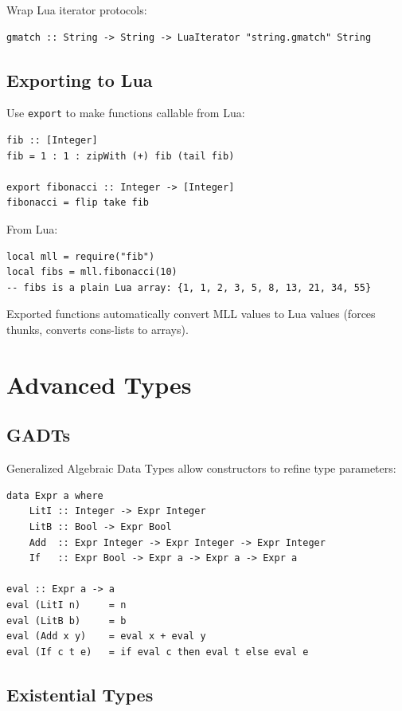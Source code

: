 \documentclass[11pt,a4paper]{article}
\begin{document}
Wrap Lua iterator protocols:

\begin{lstlisting}
gmatch :: String -> String -> LuaIterator "string.gmatch" String
\end{lstlisting}

\subsection{Exporting to Lua}

Use \texttt{export} to make functions callable from Lua:

\begin{lstlisting}
fib :: [Integer]
fib = 1 : 1 : zipWith (+) fib (tail fib)

export fibonacci :: Integer -> [Integer]
fibonacci = flip take fib
\end{lstlisting}

From Lua:
\begin{lstlisting}[language={}]
local mll = require("fib")
local fibs = mll.fibonacci(10)
-- fibs is a plain Lua array: {1, 1, 2, 3, 5, 8, 13, 21, 34, 55}
\end{lstlisting}

Exported functions automatically convert MLL values to Lua values
(forces thunks, converts cons-lists to arrays).

\section{Advanced Types}

\subsection{GADTs}

Generalized Algebraic Data Types allow constructors to refine type
parameters:

\begin{lstlisting}
data Expr a where
    LitI :: Integer -> Expr Integer
    LitB :: Bool -> Expr Bool
    Add  :: Expr Integer -> Expr Integer -> Expr Integer
    If   :: Expr Bool -> Expr a -> Expr a -> Expr a

eval :: Expr a -> a
eval (LitI n)     = n
eval (LitB b)     = b
eval (Add x y)    = eval x + eval y
eval (If c t e)   = if eval c then eval t else eval e
\end{lstlisting}

\subsection{Existential Types}
\end{document}
